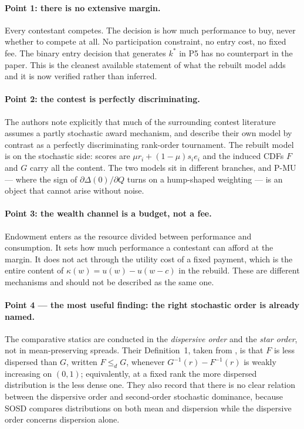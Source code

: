 \documentclass[11pt,a4paper]{article}
\begin{document}
\paragraph{Point 1: there is no extensive margin.} Every contestant competes.
The decision is how much performance to buy, never whether to compete at all.
No participation constraint, no entry cost, no fixed fee. The binary entry
decision that generates $k^*$ in P5 has no counterpart in the paper. This is the
cleanest available statement of what the rebuilt model adds and it is now
verified rather than inferred.

\paragraph{Point 2: the contest is perfectly discriminating.} The authors note
explicitly that much of the surrounding contest literature assumes a partly
stochastic award mechanism, and describe their own model by contrast as a
perfectly discriminating rank-order tournament. The rebuilt model is on the
stochastic side: scores are $\mu r_i + (1-\mu) s_i e_i$ and the induced CDFs
$F$ and $G$ carry all the content. The two models sit in different branches, and
P-MU --- where the sign of $\partial \Delta(0) / \partial Q$ turns on a
hump-shaped weighting --- is an object that cannot arise without noise.

\paragraph{Point 3: the wealth channel is a budget, not a fee.} Endowment enters
as the resource divided between performance and consumption. It sets how much
performance a contestant can afford at the margin. It does not act through the
utility cost of a fixed payment, which is the entire content of
$\kappa(w) = u(w) - u(w-c)$ in the rebuild. These are different mechanisms and
should not be described as the same one.

\paragraph{Point 4 --- the most useful finding: the right stochastic order is
already named.} The comparative statics are conducted in the \emph{dispersive
order} and the \emph{star order}, not in mean-preserving spreads. Their
Definition~1, taken from \citet{ShakedShanthikumar2007}, is that $F$ is less
dispersed than $G$, written $F \leq_d G$, whenever $G^{-1}(r) - F^{-1}(r)$ is
weakly increasing on $(0,1)$; equivalently, at a fixed rank the more dispersed
distribution is the less dense one. They also record that there is no clear
relation between the dispersive order and second-order stochastic dominance,
because SOSD compares distributions on both mean and dispersion while the
dispersive order concerns dispersion alone.
\end{document}
